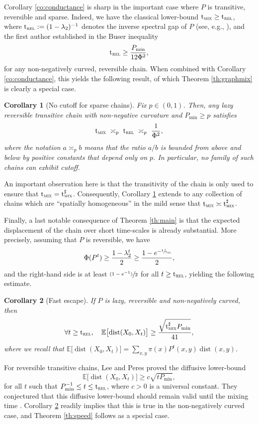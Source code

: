 \documentclass[JEP,XML,SOM,Unicode,NoEqCountersInSection,published]{cedram}
\newcommand{\psfrac}[2]{\sfrac{(#1)}{#2}}
\newtheorem{corollary}{Corollary}
\theoremstyle{definition}
\newcommand{\EE}{{\mathbb{E}}}
\newcommand{\trel}{\mathrm{t}_{\textup{\textsc{rel}}}}
\newcommand{\tmix}{\mathrm{t}_{\textup{\textsc{mix}}}}
\newcommand{\pmin}{P_{\mathrm{min}}}
\DeclareMathOperator{\dist}{dist}
\begin{document}
Corollary \ref{co:conductance} is sharp in the important case where $P$ is transitive, reversible and sparse. Indeed, we have the classical lower-bound $\tmix\ge\trel$, where $\trel:=(1-\lambda_2)^{-1}$ denotes the inverse spectral gap of $P$ (see, e.g., \cite{MR3726904}), and the first author established in \cite{munch2019non} the Buser inequality
\begin{equation*}
\trel \ge \frac{\pmin}{12\Phi^2},
\end{equation*}
for any non-negatively curved, reversible chain. When combined with Corollary \ref{co:conductance}, this yields the following result, of which Theorem \ref{th:graphmix} is clearly a special case.
\begin{corollary}[No cutoff for sparse chains]\label{co:cutoff}Fix $p\in(0,1)$. Then, any lazy reversible transitive chain with non-negative curvature and $\pmin\ge p$ satisfies
\begin{equation*}
\tmix \ \asymp_p \ \trel \ \asymp_p \ \frac{1}{\Phi^2},
\end{equation*}
where the notation $a\asymp_p b$ means that the ratio $a/b$ is bounded from above and below by positive constants that depend only on $p$. In particular, no family of such chains can exhibit cutoff.
\end{corollary}
An important observation here is that the transitivity of the chain is only used to ensure that $\tmix=\tmix^\sharp$. Consequently, Corollary \ref{co:cutoff} extends to any collection of chains which are ``spatially homogeneous'' in the mild sense that $\tmix\asymp\tmix^\sharp$.

Finally, a last notable consequence of Theorem \ref{th:main} is that the expected displacement of the chain over short time-scales is already substantial. More precisely, assuming that $P$ is reversible, we have
\begin{equation*}
\Phi(P^t) \ge \frac{1-\lambda_2^t}{2}\ge \frac{1-e^{-\sfrac{t}{\trel}}}{2},
\end{equation*}
and the right-hand side is at least $\psfrac{1-e^{-1}}{2}$ for all $t\ge \trel$, yielding the following estimate.

\begin{corollary}[Fast escape]\label{co:escape}If $P$ is lazy, reversible and non-negatively curved, then
\begin{equation*}
\forall t\ge\trel,\quad \EE \bigl[\dist(X_0,X_t) \bigr] \ge \frac{\sqrt{\tmix^\sharp\pmin}}{41},
\end{equation*}
where we recall that $\EE \bigl[\dist(X_0,X_t) \bigr]=\sum_{x,y}\pi(x)P^t(x,y)\dist(x,y)$.
\end{corollary}
For reversible transitive chains, Lee and Peres \cite{MR3127886} proved the diffusive lower-bound
\begin{equation*}
\EE \bigl[\dist(X_0,X_t) \bigr] \ge c\sqrt{t\pmin},
\end{equation*} for all $t$ such that $\pmin^{-1}\le t\le \trel$, where $c>0$ is a universal constant. They conjectured that this diffusive lower-bound should remain valid until the mixing time \cite[Conj.\,2.5]{MR3127886}. Corollary \ref{co:escape} readily implies that this is true in the non-negatively curved case, and Theorem \ref{th:speed} follows as a special case.
\end{document}
